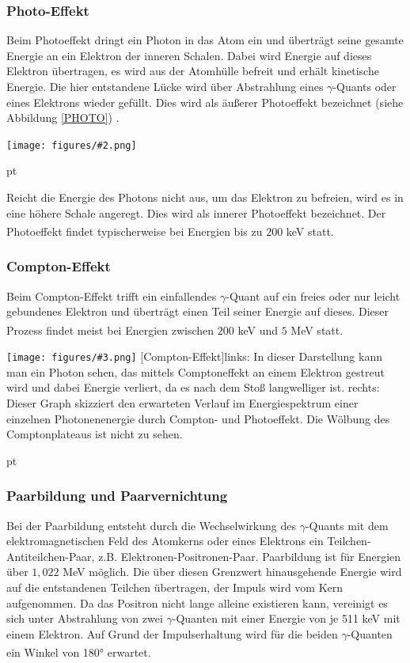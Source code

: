 \documentclass[12pt,listof=totoc]{scrartcl}
\newcommand{\gra}[3][0.7]{
	\begin{minipage}[h!]{\textwidth}
		\centering
		\texttt{[image: figures/\#2.png]}
		\captionof{figure}{#3}
	\end{minipage}
	\vskip 30 pt
}
\newcommand{\graShort}[4][0.7]{
	\begin{minipage}[h!]{\textwidth}
		\centering
		\texttt{[image: figures/\#3.png]}
		\captionof{figure}[#2]{#4}
	\end{minipage}
	\vskip 30 pt
}
\begin{document}
 \subsubsection{Photo-Effekt}
 Beim Photoeffekt dringt ein Photon in das Atom ein und überträgt seine gesamte Energie an ein Elektron der inneren Schalen. Dabei wird Energie auf dieses Elektron übertragen, es wird aus der Atomhülle befreit und erhält kinetische Energie. Die hier entstandene Lücke wird über Abstrahlung eines $\gamma$-Quants oder eines Elektrons wieder gefüllt. Dies wird als äußerer Photoeffekt bezeichnet (siehe Abbildung \ref{PHOTO}) .

  \gra{Photo}{Äußerer Photoeffekt\cite{staat} \label{PHOTO}}
  Reicht die Energie des Photons nicht aus, um das Elektron zu befreien, wird es in eine höhere Schale angeregt. Dies wird als innerer Photoeffekt bezeichnet.
  Der Photoeffekt findet typischerweise bei Energien bis zu $200$ keV statt.\textsuperscript{\cite{anleitung1}}
 \subsubsection{Compton-Effekt}
 Beim Compton-Effekt trifft ein einfallendes $\gamma$-Quant auf ein freies oder nur leicht gebundenes Elektron und überträgt einen Teil seiner Energie auf dieses. Dieser Prozess findet meist bei Energien zwischen $200$ keV und $5$ MeV statt.\textsuperscript{\cite{anleitung1}}
 

 \graShort{Compton-Effekt}{Compton}{links: In dieser Darstellung kann man ein Photon sehen, das mittels Comptoneffekt an einem Elektron gestreut wird und dabei Energie verliert, da es nach dem Stoß langwelliger ist.\cite{staat} rechts: Dieser Graph skizziert den erwarteten Verlauf im Energiespektrum einer einzelnen
 Photonenenergie durch Compton- und Photoeffekt. Die Wölbung des Comptonplateaus ist nicht zu
 sehen.\cite{med}}
 \subsubsection{Paarbildung und Paarvernichtung \label{PVN1}}
 Bei der Paarbildung entsteht durch die Wechselwirkung des $\gamma$-Quants mit dem elektromagnetischen Feld des Atomkerns oder eines Elektrons ein Teilchen-Antiteilchen-Paar, z.B. Elektronen-Positronen-Paar. Paarbildung ist für Energien über $1,022$ MeV möglich. Die über diesen Grenzwert hinausgehende Energie wird auf die entstandenen Teilchen übertragen, der Impuls wird vom Kern aufgenommen. Da das Positron nicht lange alleine existieren kann, vereinigt es sich unter Abstrahlung von zwei $\gamma$-Quanten mit einer Energie von je 511 keV mit einem Elektron. Auf Grund der Impulserhaltung wird für die beiden $\gamma$-Quanten ein Winkel von 180° erwartet. \textsuperscript{\cite{anleitung}}
\end{document}
